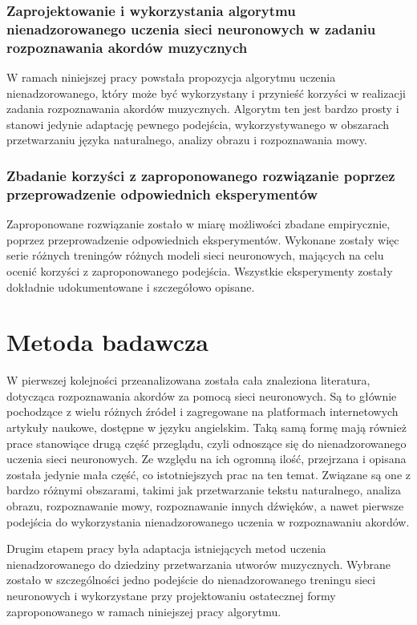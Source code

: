 \subsubsection{Zaprojektowanie i wykorzystania algorytmu nienadzorowanego uczenia sieci neuronowych w zadaniu rozpoznawania akordów muzycznych}

W ramach niniejszej pracy powstała propozycja algorytmu uczenia nienadzorowanego, który może być wykorzystany i przynieść korzyści w realizacji zadania rozpoznawania akordów muzycznych. Algorytm ten jest bardzo prosty i stanowi jedynie adaptację pewnego podejścia, wykorzystywanego w obszarach przetwarzaniu języka naturalnego, analizy obrazu i rozpoznawania mowy.

\subsubsection{Zbadanie korzyści z zaproponowanego rozwiązanie poprzez przeprowadzenie odpowiednich eksperymentów}

Zaproponowane rozwiązanie zostało w miarę możliwości zbadane empirycznie, poprzez przeprowadzenie odpowiednich eksperymentów. Wykonane zostały więc serie różnych treningów różnych modeli sieci neuronowych, mających na celu ocenić korzyści z zaproponowanego podejścia. Wszystkie eksperymenty zostały dokładnie udokumentowane i szczegółowo opisane.



\section{Metoda badawcza}

W pierwszej kolejności przeanalizowana została cała znaleziona literatura, dotycząca rozpoznawania akordów za pomocą sieci neuronowych. Są to głównie pochodzące z wielu różnych źródeł i zagregowane na platformach internetowych artykuły naukowe, dostępne w języku angielskim. Taką samą formę mają również prace stanowiące drugą część przeglądu, czyli odnoszące się do nienadzorowanego uczenia sieci neuronowych. Ze względu na ich ogromną ilość, przejrzana i opisana została jedynie mała część, co istotniejszych prac na ten temat. Związane są one z bardzo różnymi obszarami, takimi jak przetwarzanie tekstu naturalnego, analiza obrazu, rozpoznawanie mowy, rozpoznawanie innych dźwięków, a nawet pierwsze podejścia do wykorzystania nienadzorowanego uczenia w rozpoznawaniu akordów.

Drugim etapem pracy była adaptacja istniejących metod uczenia nienadzorowanego do dziedziny przetwarzania utworów muzycznych. Wybrane zostało w szczególności jedno podejście do nienadzorowanego treningu sieci neuronowych i wykorzystane przy projektowaniu ostatecznej formy zaproponowanego w ramach niniejszej pracy algorytmu.

